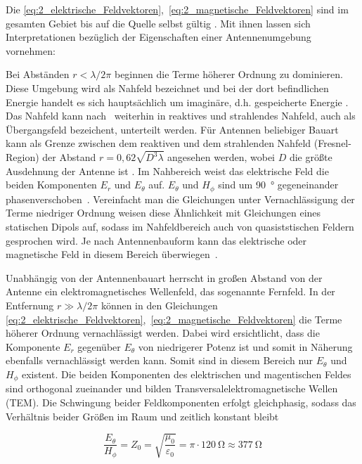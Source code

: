 Die \Gleichungen \eqref{eq:2_elektrische_Feldvektoren},~\eqref{eq:2_magnetische_Feldvektoren} sind im gesamten Gebiet bis auf die Quelle selbst gültig \cite{Antenna_Theory}. Mit ihnen lassen sich Interpretationen bezüglich der Eigenschaften einer Antennenumgebung vornehmen:
\par
\vspace{\linespace}
Bei Abständen $r< \lambda / 2\pi$ beginnen die Terme höherer Ordnung zu dominieren. Diese Umgebung wird als Nahfeld bezeichnet und bei der dort befindlichen Energie handelt es sich hauptsächlich um imaginäre, d.h. gespeicherte Energie \cite{Antenna_Theory}. Das Nahfeld kann nach~\cite{Bundesnetzagentur_Glossar_Nahfeld} weiterhin in reaktives und strahlendes Nahfeld, auch als Übergangsfeld bezeichent, unterteilt werden. Für Antennen beliebiger Bauart kann als Grenze zwischen dem reaktiven und dem strahlenden Nahfeld (Fresnel-Region) der Abstand \mbox{$r=0,62 \sqrt{D^3\lambda}$} angesehen werden, wobei $D$ die größte Ausdehnung der Antenne ist \cite{Antenna_Theory}. Im Nahbereich weist das elektrische Feld die beiden Komponenten $E_r$ und $E_{\theta}$ auf. $E_\theta$ und $H_\phi$ sind um \SI{90}{\degree} gegeneinander phasenverschoben~\cite{EM_Schirmung}. Vereinfacht man die Gleichungen unter Vernachlässigung der Terme niedriger Ordnung weisen diese Ähnlichkeit mit Gleichungen eines statischen Dipols auf, sodass im Nahfeldbereich auch von quasiststischen Feldern gesprochen wird. Je nach Antennenbauform kann das elektrische oder magnetische Feld in diesem Bereich überwiegen~\cite{EMV}. 
\par
\vspace{\linespace}
Unabhängig von der Antennenbauart herrscht in großen Abstand von der Antenne ein elektromagnetisches Wellenfeld, das sogenannte Fernfeld. In der Entfernung $r\gg \lambda / 2\pi$ können in den Gleichungen \eqref{eq:2_elektrische_Feldvektoren},~\eqref{eq:2_magnetische_Feldvektoren} die Terme höherer Ordnung vernachlässigt werden. Dabei wird ersichtlicht, dass die Komponente $E_r$ gegenüber $E_\theta$ von niedrigerer Potenz ist und somit in Näherung ebenfalls vernachlässigt werden kann. Somit sind in diesem Bereich nur $E_\theta$ und $H_\phi$ existent. Die beiden Komponenten des elektrischen und magentischen Feldes sind orthogonal zueinander und bilden Transversalelektromagnetische Wellen (TEM). Die Schwingung beider Feldkomponenten erfolgt gleichphasig, sodass das Verhältnis beider Größen im Raum und zeitlich konstant bleibt \cite{EMV}

\begin{equation}
    \frac{E_{\theta}}{H_{\phi}} = Z_0 = \sqrt{\frac{\mu_0}{\varepsilon_0}} = \pi \cdot \SI{120}{\ohm} \approx \SI{377}{\ohm}
\end{equation}

